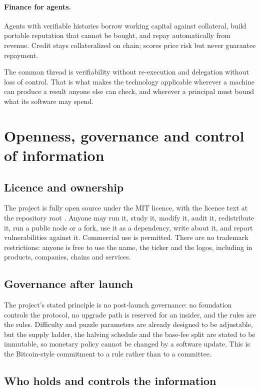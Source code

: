 \documentclass{article}
\begin{document}
\paragraph{Finance for agents.} Agents with verifiable histories borrow working
capital against collateral, build portable reputation that cannot be bought, and
repay automatically from revenue. Credit stays collateralized on chain; scores
price risk but never guarantee repayment.

The common thread is verifiability without re-execution and delegation without
loss of control. That is what makes the technology applicable wherever a machine
can produce a result anyone else can check, and wherever a principal must bound
what its software may spend.


\section{Openness, governance and control of information}
\label{sec:governance}

\subsection{Licence and ownership}

The project is fully open source under the MIT licence, with the licence text
at the repository root
\cite{srct-repo}. Anyone may run it, study it, modify it, audit it,
redistribute it, run a public node or a fork, use it as a dependency, write
about it, and report vulnerabilities against it. Commercial use is permitted.
There are no trademark restrictions: anyone is free to use
the name, the ticker and the logos, including in products, companies, chains
and services.

\subsection{Governance after launch}

The project's stated principle is no post-launch governance: no foundation
controls the protocol, no upgrade path is reserved for an insider, and the
rules are the rules. Difficulty and puzzle parameters are already designed to
be adjustable, but the supply ladder, the halving schedule and the base-fee
split are stated to be immutable, so monetary policy cannot be changed by a
software update. This is the Bitcoin-style commitment to a rule rather than to
a committee.

\subsection{Who holds and controls the information}
\end{document}
